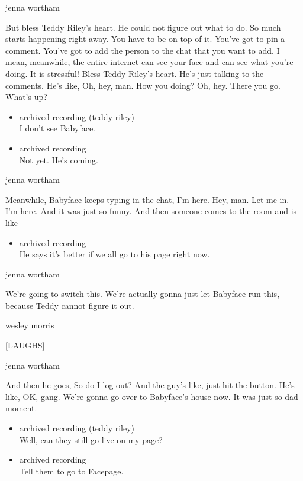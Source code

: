 jenna wortham

But bless Teddy Riley's heart. He could not figure out what to do. So
much starts happening right away. You have to be on top of it. You've
got to pin a comment. You've got to add the person to the chat that you
want to add. I mean, meanwhile, the entire internet can see your face
and can see what you're doing. It is stressful! Bless Teddy Riley's
heart. He's just talking to the comments. He's like, Oh, hey, man. How
you doing? Oh, hey. There you go. What's up?

\begin{itemize}
\item
  archived recording (teddy riley)\\
  I don't see Babyface.
\item
  archived recording\\
  Not yet. He's coming.
\end{itemize}

jenna wortham

Meanwhile, Babyface keeps typing in the chat, I'm here. Hey, man. Let me
in. I'm here. And it was just so funny. And then someone comes to the
room and is like ---

\begin{itemize}
\tightlist
\item
  archived recording\\
  He says it's better if we all go to his page right now.
\end{itemize}

jenna wortham

We're going to switch this. We're actually gonna just let Babyface run
this, because Teddy cannot figure it out.

wesley morris

{[}LAUGHS{]}

jenna wortham

And then he goes, So do I log out? And the guy's like, just hit the
button. He's like, OK, gang. We're gonna go over to Babyface's house
now. It was just so dad moment.

\begin{itemize}
\item
  archived recording (teddy riley)\\
  Well, can they still go live on my page?
\item
  archived recording\\
  Tell them to go to Facepage.
\end{itemize}

